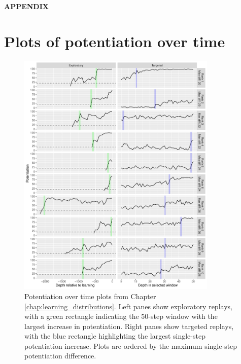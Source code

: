 \begingroup
\let\clearpage\relax
\centerline{\textbf{APPENDIX}}
\vspace{0.5em}
\chapter*{Plots of potentiation over time}
\label{chap:app_a}
\endgroup

\begin{figure}[!h]
    \begin{center}
    \includegraphics[width=0.85\textwidth]{07_appendix_potentiation_over_time/media/reps_1_10.pdf}
    \caption{Potentiation over time plots from Chapter \ref{chap:learning_distributions}.
    Left panes show exploratory replays, with a green rectangle indicating the 50-step window with the largest increase in potentiation. 
    Right panes show targeted replays, with the blue rectangle highlighting the largest single-step potentiation increase.
    Plots are ordered by the maximum single-step potentiation difference. }
    \label{fig:app_a_1_10}
    \end{center}
\end{figure}

